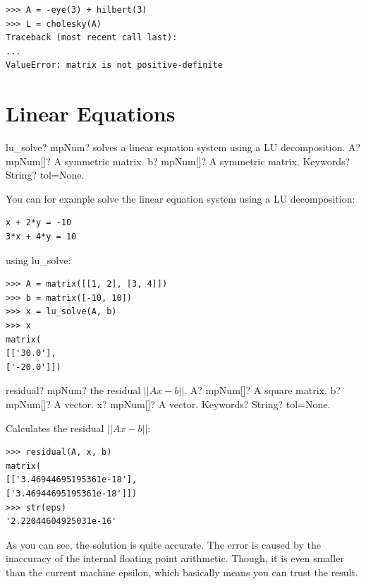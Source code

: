 \begin{lstlisting}
>>> A = -eye(3) + hilbert(3)
>>> L = cholesky(A)
Traceback (most recent call last):
...
ValueError: matrix is not positive-definite
\end{lstlisting}




\newpage
\section{Linear Equations}


\begin{mpFunctionsExtract}
	\mpFunctionThree
	{lu\_solve? mpNum? solves a linear equation system using a LU decomposition.}
	{A? mpNum[]? A symmetric matrix.}
	{b? mpNum[]? A symmetric matrix.}	
	{Keywords? String?  tol=None.}
\end{mpFunctionsExtract}


You can for example solve the linear equation system using a LU decomposition:

\begin{lstlisting}
x + 2*y = -10
3*x + 4*y = 10
\end{lstlisting}

using lu\_solve:

\begin{lstlisting}
>>> A = matrix([[1, 2], [3, 4]])
>>> b = matrix([-10, 10])
>>> x = lu_solve(A, b)
>>> x
matrix(
[['30.0'],
['-20.0']])
\end{lstlisting}


\begin{mpFunctionsExtract}
	\mpFunctionFour
	{residual? mpNum? the residual  $||Ax-b||$.}
	{A? mpNum[]? A square matrix.}
	{b? mpNum[]? A vector.}
	{x? mpNum[]? A vector.}		
	{Keywords? String?  tol=None.}
\end{mpFunctionsExtract}


Calculates the residual  $||Ax-b||$:

\begin{lstlisting}
>>> residual(A, x, b)
matrix(
[['3.46944695195361e-18'],
['3.46944695195361e-18']])
>>> str(eps)
'2.22044604925031e-16'
\end{lstlisting}

As you can see, the solution is quite accurate. The error is caused by the inaccuracy of the internal floating point arithmetic. Though, it is even smaller than the current machine epsilon, which basically means you can trust the result.


